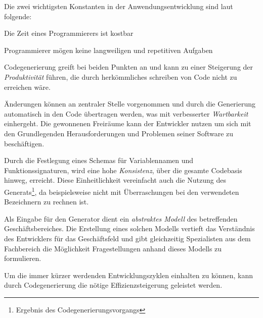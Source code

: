 
Die zwei wichtigsten Konstanten in der Anwendungsentwicklung sind laut \parencite{herrington2003code} folgende:
\begin{compactitem}
    \item Die Zeit eines Programmierers ist kostbar
    \item Programmierer mögen keine langweiligen und repetitiven Aufgaben
\end{compactitem}
Codegenerierung greift bei beiden Punkten an und kann zu einer Steigerung der \emph{Produktivität} führen, die durch herkömmliches schreiben von Code nicht zu erreichen wäre. 

Änderungen können an zentraler Stelle vorgenommen und durch die Generierung automatisch in den Code übertragen werden, was mit verbesserter \emph{Wartbarkeit} einhergeht.
Die gewonnenen Freiräume kann der Entwickler nutzen um sich mit den Grundlegenden Herausforderungen und Problemen seiner Software zu beschäftigen.

Durch die Festlegung eines Schemas für Variablennamen und Funktionssignaturen, wird eine hohe \emph{Konsistenz}, über die gesamte Codebasis hinweg, erreicht.
Diese Einheitlichkeit vereinfacht auch die Nutzung des Generats\footnote{Ergebnis des Codegenerierungsvorgangs}, da beispielsweise nicht mit Überraschungen bei den verwendeten Bezeichnern zu rechnen ist.

Als Eingabe für den Generator dient ein \emph{abstraktes Modell} des betreffenden Geschäftsbereiches. Die Erstellung eines solchen Modells vertieft das Verständnis des Entwicklers für das Geschäftsfeld und gibt gleichzeitig Spezialisten aus dem Fachbereich die Möglichkeit Fragestellungen anhand dieses Modells zu formulieren.

Um die immer kürzer werdenden Entwicklungszyklen einhalten zu können, kann durch Codegenerierung die nötige Effizienzsteigerung geleistet werden.

